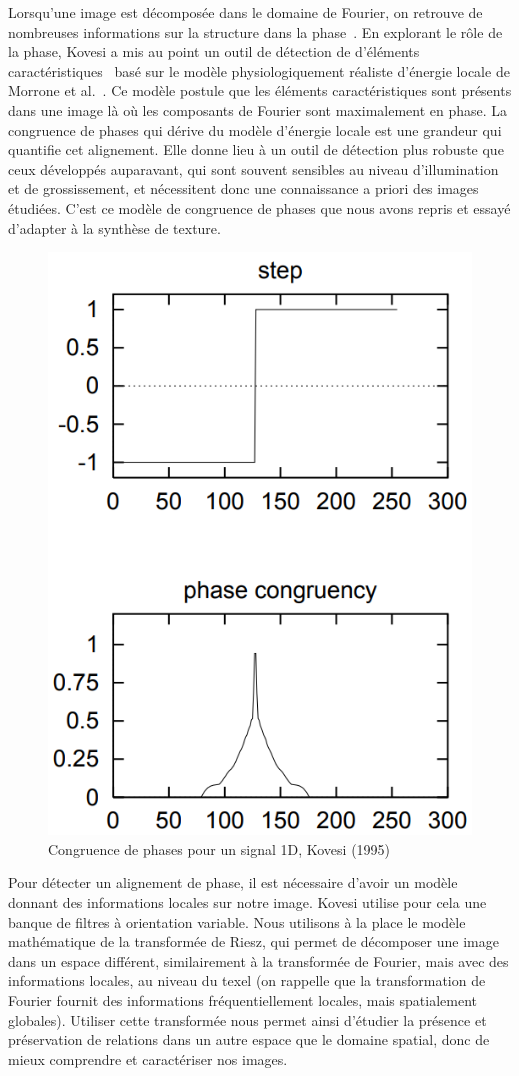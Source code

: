\bigskip

Lorsqu'une image est décomposée dans le domaine de Fourier, on retrouve de nombreuses informations sur la structure dans la phase~\cite{oppenheim_importance_1981}. En explorant le rôle de la phase, Kovesi a mis au point un outil de détection de d'éléments caractéristiques~\cite{kovesi_image_1995} basé sur le modèle physiologiquement réaliste d'énergie locale de Morrone et al.~\cite{morrone_feature_1987, morrone_feature_1988}. Ce modèle postule que les éléments caractéristiques sont présents dans une image là où les composants de Fourier sont maximalement en phase. La congruence de phases qui dérive du modèle d'énergie locale est une grandeur qui quantifie cet alignement. Elle donne lieu à un outil de détection plus robuste que ceux développés auparavant, qui sont souvent sensibles au niveau d'illumination et de grossissement, et nécessitent donc une connaissance a priori des images étudiées. C'est ce modèle de congruence de phases que nous avons repris et essayé d'adapter à la synthèse de texture.

\bigskip

\begin{figure}[h]
    \centering
    \includegraphics[width=.35\linewidth]{contenu/resources/images/pc_1d_kovesi}
    \caption[Congruence de phases pour un signal 1D]{Congruence de phases pour un signal 1D, Kovesi (1995)~\cite{kovesi_image_1995}}
    \label{fig:pc_1d_kovesi}
\end{figure}

Pour détecter un alignement de phase, il est nécessaire d'avoir un modèle donnant des informations locales sur notre image. Kovesi utilise pour cela une banque de filtres à orientation variable. Nous utilisons à la place le modèle mathématique de la transformée de Riesz, qui permet de décomposer une image dans un espace différent, similairement à la transformée de Fourier, mais avec des informations locales, au niveau du texel (on rappelle que la transformation de Fourier fournit des informations fréquentiellement locales, mais spatialement globales). Utiliser cette transformée nous permet ainsi d'étudier la présence et préservation de relations dans un autre espace que le domaine spatial, donc de mieux comprendre et caractériser nos images.


